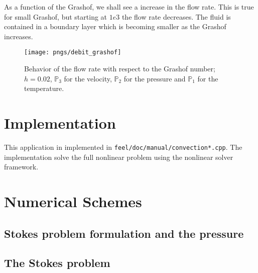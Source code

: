 As a function of the Grashof, we shall see a increase in the flow
rate. This is true for small Grashof, but starting at $1e3$ the flow
rate decreases. The fluid is contained in a boundary layer which is
becoming smaller as the Grashof increases.

\begin{figure}[htbp]
  \centering
  \texttt{[image: pngs/debit\_grashof]}
  \caption{Behavior of the flow rate with respect to the Grashof number; $h = 0.02$,
    $\mathbb{P}_3$ for the velocity, $\mathbb{P}_2$ for the pressure and
    $\mathbb{P}_1$ for the temperature.}
  \label{fig:4}
\end{figure}

\section{Implementation}
\label{sec:implementation}

This application in implemented in
\texttt{feel/doc/manual/convection*.cpp}. The implementation solve
the full nonlinear problem using the nonlinear solver framework.

\section{Numerical Schemes}
\label{sec:numerical-schemes}

\subsection{Stokes problem formulation and the pressure}
\label{sec:stok-probl-form}

\subsection{The Stokes problem}
\label{sec:stokes-problem}

